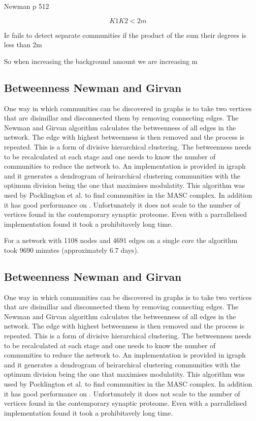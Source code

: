 Newman p 512

\begin{equation}
    K1K2 < 2m
\end{equation}

Ie fails to detect separate communities if the product of the sum their degrees is less than 2m

So when increasing the background amount we are increasing m
\subsection{Betweenness Newman and Girvan}
One way in which communities can be discovered in graphs is to take two vertices that are
disimillar and disconnected them by removing connecting edges.
The Newman and Girvan algorithm \cite{newman2004finding}  calculates the betweenness
of all edges in the network. The edge with highest betweenness is then removed and the
process is repeated. This is a form of divisive hierarchical clustering. The betweenness
needs to be recalculated at each stage and one needs to know the number of communities
to reduce the network to. An implementation is provided in igraph and it generates a dendrogram of heirarchical clustering communities with the optimum division being the one that maximises modulatity. This algorithm was used by Pocklington et al. \cite{pocklington2006proteomes} to find
communities in the MASC complex. In addition it has good performance on . Unfortunately it does not scale to the number of
vertices found in the contemporary synaptic proteome. Even with a parrallelised implementation found it took a prohibitavely long time. 

For a network with 1108 nodes and 4691 edges on a single core the algorithm took 9690 minutes (approximately 6.7 days). \cite{mclean2016improved}


\subsection{Betweenness Newman and Girvan}
One way in which communities can be discovered in graphs is to take two vertices that are
disimillar and disconnected them by removing connecting edges.
The Newman and Girvan algorithm \cite{newman2004finding}  calculates the betweenness
of all edges in the network. The edge with highest betweenness is then removed and the
process is repeated. This is a form of divisive hierarchical clustering. The betweenness
needs to be recalculated at each stage and one needs to know the number of communities
to reduce the network to. An implementation is provided in igraph and it generates a dendrogram of heirarchical clustering communities with the optimum division being the one that maximises modulatity. This algorithm was used by Pocklington et al. \cite{pocklington2006proteomes} to find
communities in the MASC complex. In addition it has good performance on . Unfortunately it does not scale to the number of
vertices found in the contemporary synaptic proteome. Even with a parrallelised implementation found it took a prohibitavely long time. 

